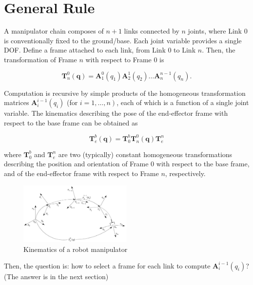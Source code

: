 \documentclass[10pt]{article}
\begin{document}
\section{General Rule}
A manipulator chain composes of $n+1$ links connected by $n$ joints, where Link 0 is conventionally fixed to the ground/base. Each joint variable provides a single DOF. Define a frame attached to each link, from Link 0 to Link $n$. Then, the  transformation of Frame $n$ with respect to Frame 0 is 

$$
    \boldsymbol{T}_{n}^{0}(\boldsymbol{q})=\boldsymbol{A}_{1}^{0}\left(q_{1}\right) \boldsymbol{A}_{2}^{1}\left(q_{2}\right) \ldots \boldsymbol{A}_{n}^{n-1}\left(q_{n}\right) .
    $$

Computation is recursive by simple products of the homogeneous transformation matrices $\boldsymbol{A}_{i}^{i-1}\left(q_{i}\right)$ (for $\left.i=1, \ldots, n\right)$, each of which is a function of a single joint variable.
The kinematics describing the pose of the end-effector frame with respect to the base frame can be obtained as

$$
\boldsymbol{T}_{e}^{b}(\boldsymbol{q})=\boldsymbol{T}_{0}^{b} \boldsymbol{T}_{n}^{0}(\boldsymbol{q}) \boldsymbol{T}_{e}^{n}
$$

where $\boldsymbol{T}_{0}^{b}$ and $\boldsymbol{T}_{e}^{n}$ are two (typically) constant homogeneous transformations describing the position and orientation of Frame 0 with respect to the base frame, and of the end-effector frame with respect to Frame $n$, respectively.

\begin{figure}[h]
    \centering
   \includegraphics[max width=0.5\textwidth]{./kinematics/forward_kin}
    \caption{Kinematics of a robot manipulator}
    \label{c1.fig.joints-types}
\end{figure}

Then, the question is: how to select a frame for each link to compute $\boldsymbol{A}_{i}^{i-1}\left(q_{i}\right)$? (The answer is in the next section)
\end{document}
